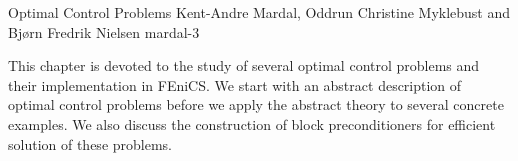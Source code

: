              {Optimal Control Problems}
              {Kent-Andre Mardal, Oddrun Christine Myklebust and Bj\o{}rn Fredrik Nielsen}
              {mardal-3}

This chapter is devoted to the study of several optimal control
problems and their implementation in FEniCS. We start with an abstract
description of optimal control problems before we apply the abstract
theory to several concrete examples. We also discuss the construction
of block preconditioners for efficient solution of these problems.
